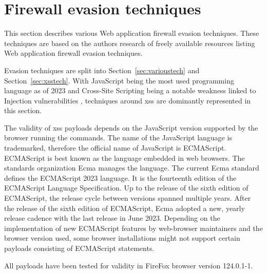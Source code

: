 \section{Firewall evasion techniques}
\label{sec:firewallevasiontechniques}

This section describes various Web application firewall evasion techniques. These techniques are based on the authors research of freely available resources listing Web application firewall evasion techniques.

Evasion techniques are split into Section~\ref{sec:varioustech} and Section~\ref{sec:xsstech}. With JavaScript being the most used programming language as of 2023 \cite{statista/mostusedlang} and Cross-Site Scripting being a notable weakness linked to Injection vulnerabilities \cite{OWASP/Injection21}, techniques around \gls{xss} are dominantly represented in this section.

The validity of \gls{xss} payloads depends on the JavaScript version supported by the browser running the commands. The name of the JavaScript language is trademarked, therefore the official name of JavaScript is ECMAScript. ECMAScript is best known as the language embedded in web browsers. The standards organization Ecma manages the language. The current Ecma standard defines the ECMAScript 2023 language. It is the fourteenth edition of the ECMAScript Language Specification. Up to the release of the sixth edition of ECMAScript, the release cycle between versions spanned multiple years. After the release of the sixth edition of ECMAScript, Ecma adopted a new, yearly release cadence with the last release in June 2023. \cite{ecma/release,ecma/intro,explorejs/ecmascript}
Depending on the implementation of new ECMAScript features by web-browser maintainers and the browser version used, some browser installations might not support certain payloads consisting of ECMAScript statements. \cite{kangax/compattable}

All payloads have been tested for validity in FireFox browser version 124.0.1-1.

